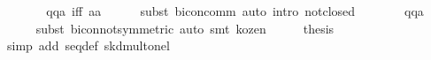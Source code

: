 \begin{isabellebody}
\ \ \isamarkupfalse%
\ \isamarkupfalse%
\ {}{}{}{}\ {}\ q{}{}{}{}q{}{}{}{}{}{}a{}\ iff\ {}a{}{}{}{}a{}{}\isanewline
\ \ \ \ \isamarkupfalse%
\ {}subst\ bicon{}comm{}\ {}auto\ intro{}\ not{}closed{}\isanewline
\ \ \isamarkupfalse%
\ \isamarkupfalse%
\ {}{}{}{}\ {}\ q{}{}{}{}q{}{}{}{}{}a{}{}\isanewline
\ \ \ \ \isamarkupfalse%
\ {}subst\ bicon{}not{}symmetric{}{}\ auto{}\ smt\ kozen{}{}{}\isanewline
\ \ \isamarkupfalse%
\ \isamarkupfalse%
\ {}thesis\isanewline
\ \ \ \ \isamarkupfalse%
\ {}simp\ add{}\ seq{}def\ skd{}mult{}onel{}\isanewline
{}\isamarkupfalse%
%
\endisatagproof
{\isafoldproof}%
%
\isadelimproof
\isanewline
%
\endisadelimproof
\isanewline
{}\isamarkupfalse%

\end{isabellebody}
